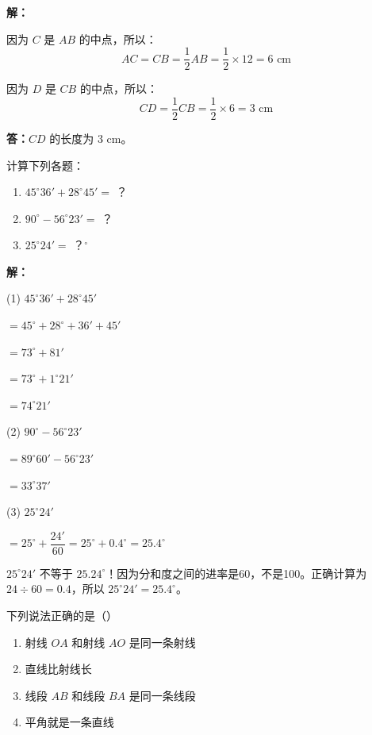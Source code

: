 \documentclass[12pt, a4paper]{ctexart}
\begin{document}
\textbf{解：}

因为 $C$ 是 $AB$ 的中点，所以：
$$AC=CB=\frac{1}{2}AB=\frac{1}{2}\times 12=6\text{ cm}$$

因为 $D$ 是 $CB$ 的中点，所以：
$$CD=\frac{1}{2}CB=\frac{1}{2}\times 6=3\text{ cm}$$

\textbf{答：}$CD$ 的长度为 $3\text{ cm}$。

\vspace{6pt}

\begin{examplebox}[【例题2】基础：角度计算]
计算下列各题：
\begin{enumerate}[nosep]
  \item $45^\circ36'+28^\circ45'=$ ？
  \item $90^\circ-56^\circ23'=$ ？
  \item $25^\circ24'=$ ？$^\circ$
\end{enumerate}
\end{examplebox}

\textbf{解：}

(1) $45^\circ36'+28^\circ45'$

$=45^\circ+28^\circ+36'+45'$

$=73^\circ+81'$

$=73^\circ+1^\circ21'$

$=74^\circ21'$

\medskip

(2) $90^\circ-56^\circ23'$

$=89^\circ60'-56^\circ23'$

$=33^\circ37'$

\medskip

(3) $25^\circ24'$

$=25^\circ+\dfrac{24'}{60}=25^\circ+0.4^\circ=25.4^\circ$

\begin{warnbox}[易错提醒]
$25^\circ24'$ 不等于 $25.24^\circ$！因为分和度之间的进率是60，不是100。正确计算为 $24\div 60=0.4$，所以 $25^\circ24'=25.4^\circ$。
\end{warnbox}

\vspace{6pt}

\begin{examplebox}[【例题3】易错：射线与角的概念辨析]
下列说法正确的是（\quad）
\begin{enumerate}[label=\Alph*., nosep]
  \item 射线 $OA$ 和射线 $AO$ 是同一条射线
  \item 直线比射线长
  \item 线段 $AB$ 和线段 $BA$ 是同一条线段
  \item 平角就是一条直线
\end{enumerate}
\end{examplebox}
\end{document}
